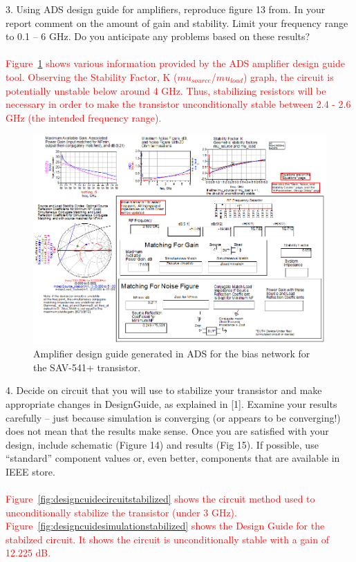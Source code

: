 \documentclass[conference]{IEEEtran}
\begin{document}
3. Using ADS design guide for amplifiers, reproduce figure 13 from\cite{payne}. In your report comment on the amount of gain and stability. Limit your frequency range to 0.1 – 6 GHz. Do you anticipate any problems based on these results?\\\\
\textcolor{red}{Figure~\ref{fig:designguide} shows various information provided by the ADS amplifier design guide tool.  Observing the Stability Factor, K ($mu_{source}$/$mu_{load}$) graph, the circuit is potentially unstable below around 4 GHz.  Thus, stabilizing resistors will be necessary in order to make the transistor unconditionally stable between 2.4 - 2.6 GHz (the intended frequency range).}

\begin{figure}[!h]
\centering
\includegraphics[scale=0.35]{pics/DesignGuideUnoptimized.png}
\caption{Amplifier design guide generated in ADS for the bias network for the SAV-541+ transistor.}
\label{fig:designguide}
\end{figure}
4. Decide on circuit that you will use to stabilize your transistor and make appropriate changes in DesignGuide, as explained in [1]. Examine your results carefully – just because simulation is converging (or appears to be converging!) does not mean that the results make sense. Once you are satisfied with your design, include schematic (Figure 14) and results (Fig 15). If possible, use “standard” component values or, even better, components that are available in IEEE store.\\\\
\textcolor{red}{Figure~\ref{fig:designcuidecircuitstabilized} shows the circuit method used to unconditionally stabilize the transistor (under 3 GHz).  Figure~\ref{fig:designcuidesimulationstabilized} shows the Design Guide for the stabilzed circuit. It shows the circuit is unconditionally stable with a gain of 12.225 dB.}
\end{document}
